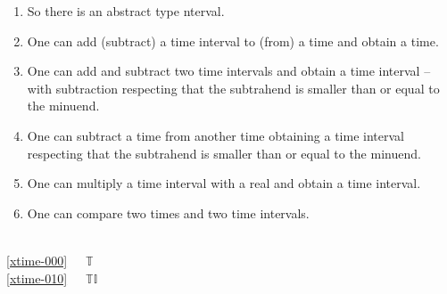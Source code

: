 \begin{enumerate}\setei
\item \label{xtime-000} So there is an abstract type nterval.
\item \label{xtime-020} One can add (subtract) a time interval to (from)
  a time and obtain a time.
\mnewfoil  
\item \label{xtime-030} One can add and subtract two time intervals and
                       obtain a time interval \nyl -- with subtraction
                       respecting that  \nyl the subtrahend is smaller than or
                       equal to the minuend. 
\item \label{xtime-040} One can subtract a time from another
                       time obtaining a time interval
                       respecting that the subtrahend is smaller than or
                       equal to the minuend.
\item \label{xtime-050} One can multiply a time interval with a real and
                       obtain a time interval.
\item \label{xtime-060} One can compare two times and two time intervals.
\savei\end{enumerate}
\pos{\psno}{\mnewfoil}
\bp
{}\\
\ref{xtime-000}\ \ \ $\mathbb{T}$ \\
\ref{xtime-010}\ \ \ $\mathbb{TI}$\\
